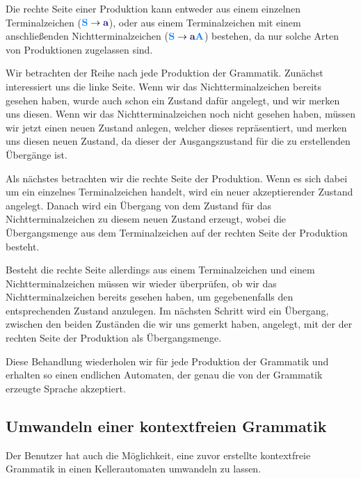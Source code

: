 Die rechte Seite einer Produktion kann entweder aus einem einzelnen
Terminalzeichen ($\NonterminalSymbol{S} \to \TerminalSymbol{a}$), oder
aus einem Terminalzeichen mit einem anschließenden Nichtterminalzeichen
($\NonterminalSymbol{S} \to \TerminalSymbol{a}\NonterminalSymbol{A}$) bestehen,
da nur solche Arten von Produktionen zugelassen sind.\vspace{10pt}

Wir betrachten der Reihe nach jede Produktion der Grammatik.
Zunächst interessiert uns die linke Seite. Wenn wir das Nichtterminalzeichen
bereits gesehen haben, wurde auch schon ein Zustand dafür angelegt, und wir
merken uns diesen. Wenn wir das Nichtterminalzeichen noch nicht gesehen haben,
müssen wir jetzt einen neuen Zustand anlegen, welcher dieses repräsentiert, und
merken uns diesen neuen Zustand, da dieser der Ausgangszustand
für die zu erstellenden Übergänge ist.\vspace{10pt}

Als nächstes betrachten wir die rechte Seite der Produktion. Wenn es sich dabei
um ein einzelnes Terminalzeichen handelt, wird ein neuer akzeptierender Zustand
angelegt. Danach wird ein Übergang von dem Zustand für das Nichtterminalzeichen
zu diesem neuen Zustand erzeugt, wobei die Übergangsmenge aus dem
Terminalzeichen auf der rechten Seite der Produktion besteht.\vspace{10pt}

Besteht die rechte Seite allerdings aus einem Terminalzeichen und einem
Nichtterminalzeichen müssen wir wieder überprüfen, ob wir das
Nichtterminalzeichen bereits gesehen haben, um gegebenenfalls den
entsprechenden Zustand anzulegen. Im nächsten Schritt wird ein Übergang,
zwischen den beiden Zuständen die wir uns gemerkt haben, angelegt, mit der der
rechten Seite der Produktion als Übergangsmenge.\vspace{10pt}

Diese Behandlung wiederholen wir für jede Produktion der Grammatik und
erhalten so einen endlichen Automaten, der genau die von der
Grammatik erzeugte Sprache akzeptiert.\vspace{10pt}

\subsection{Umwandeln einer kontextfreien Grammatik}\label{ConverToGrammarContextFree}

Der Benutzer hat auch die Möglichkeit, eine zuvor erstellte kontextfreie
Grammatik in einen Kellerautomaten umwandeln zu lassen.\vspace{10pt}

